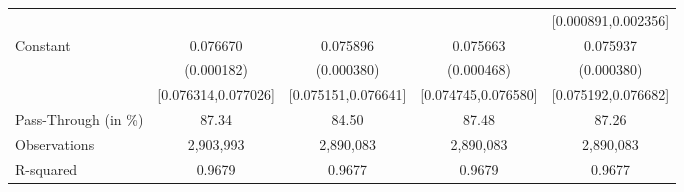 {\begin{tabular}{l*{4}{c}}
                    &                     &                     &                     &[0.000891,0.002356]         \\
Constant            &    0.076670\sym{***}&    0.075896\sym{***}&    0.075663\sym{***}&    0.075937\sym{***}\\
                    &  (0.000182)         &  (0.000380)         &  (0.000468)         &  (0.000380)         \\
                    &[0.076314,0.077026]         &[0.075151,0.076641]         &[0.074745,0.076580]         &[0.075192,0.076682]         \\
\midrule
Pass-Through (in \%)&       87.34         &       84.50         &       87.48         &       87.26         \\
Observations        &   2,903,993         &   2,890,083         &   2,890,083         &   2,890,083         \\
R-squared           &      0.9679         &      0.9677         &      0.9679         &      0.9677         \\
\bottomrule
\end{tabular}
}
